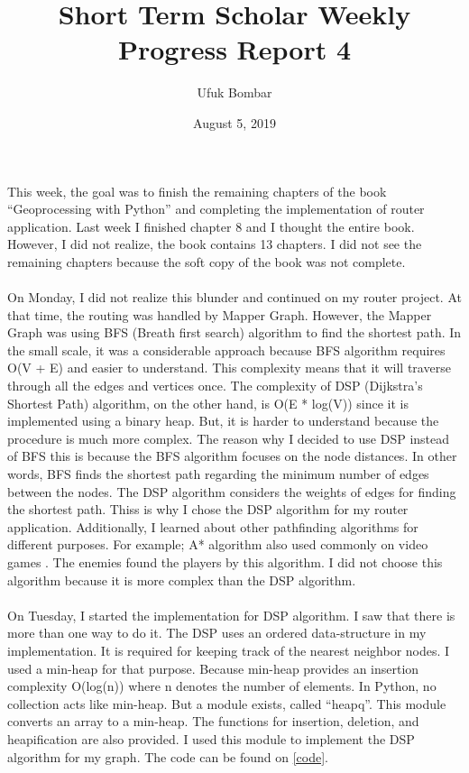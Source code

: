 \documentclass[a4paper]{article}
\title{Short Term Scholar Weekly Progress Report 4}
\author{Ufuk Bombar}
\date{August 5, 2019}
\begin{document}
\maketitle

\paragraph{}
This week, the goal was to finish the remaining chapters of the book “Geoprocessing with Python” and completing the implementation of router application. Last week I finished chapter 8 and I thought the entire book. However, I did not realize, the book contains 13 chapters. I did not see the remaining chapters because the soft copy of the book was not complete.

\paragraph{}
On Monday, I did not realize this blunder and continued on my router project. At that time, the routing was handled by Mapper Graph. However, the Mapper Graph was using BFS (Breath first search) algorithm to find the shortest path. In the small scale, it was a considerable approach because BFS algorithm requires O(V + E) and easier to understand. This complexity means that it will traverse through all the edges and vertices once. The complexity of DSP (Dijkstra’s Shortest Path) algorithm, on the other hand, is O(E * log(V)) since it is implemented using a binary heap. But, it is harder to understand because the procedure is much more complex. The reason why I decided to use DSP instead of BFS this is because the BFS algorithm focuses on the node distances. In other words, BFS finds the shortest path regarding the minimum number of edges between the nodes. The DSP algorithm considers the weights of edges for finding the shortest path. Thiss is why I chose the DSP algorithm for my router application. Additionally, I learned about other pathfinding algorithms for different purposes. For example; A* algorithm also used commonly on video games \cite{astar}. The enemies found the players by this algorithm. I did not choose this algorithm because it is more complex than the DSP algorithm.

\paragraph{}
On Tuesday, I started the implementation for DSP algorithm. I saw that there is more than one way to do it. The DSP uses an ordered data-structure in my implementation. It is required for keeping track of the nearest neighbor nodes. I used a min-heap for that purpose. Because min-heap provides an insertion complexity O(log(n)) where n denotes the number of elements. In Python, no collection acts like min-heap. But a module exists, called “heapq”. This module converts an array to a min-heap. The functions for insertion, deletion, and heapification are also provided. I used this module to implement the DSP algorithm for my graph. The code can be found on \ref{code}.
\end{document}
